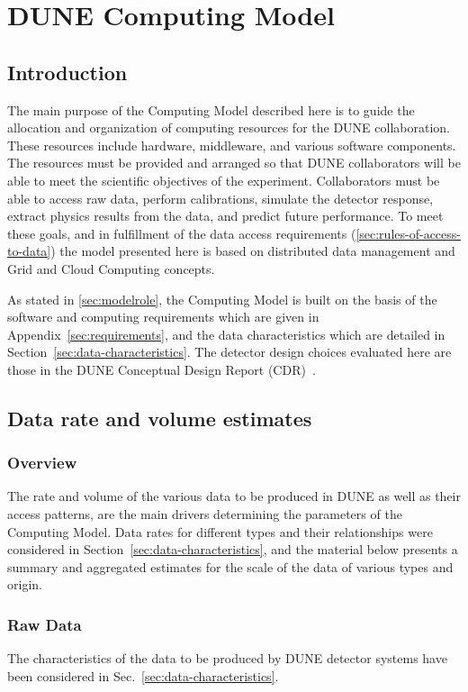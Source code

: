 \section{DUNE Computing Model}
\label{sec:computing_model}

\subsection{Introduction}

The main purpose of the Computing Model described here is to guide the allocation and organization of computing
resources for the DUNE collaboration.  These resources include hardware, middleware, and various software components.
The resources must be provided and arranged so that DUNE collaborators will be able to meet the scientific objectives
of the experiment.  Collaborators must be able to access raw data, perform calibrations, simulate the detector
response, extract physics results from the data, and predict future performance.
To meet these goals, and in fulfillment of the data access requirements (\ref{sec:rules-of-access-to-data})
the model presented here is based on distributed data management and Grid and Cloud Computing concepts.

As stated in \ref{sec:modelrole}, the Computing Model is built on the basis of the software and computing requirements
which are given in Appendix~\ref{sec:requirements}, and the data characteristics which are detailed in Section~\ref{sec:data-characteristics}.
The detector design choices evaluated here are those in the DUNE Conceptual Design Report (CDR)~\cite{cdr_vol2,cdr_vol4_docdb}.

\subsection{Data rate and volume estimates}
\label{sec:data-rate-and-volume-estimates}
\subsubsection{Overview}
The rate and volume of the various data to be produced in DUNE as well as their access patterns, are the main drivers determining the parameters
of the Computing Model. Data rates for different types and their relationships were considered in Section~\ref{sec:data-characteristics},
and the material below presents a summary and aggregated estimates for the scale of the data of various types
and origin.

\subsubsection{Raw Data}
The characteristics of the data to be produced by DUNE detector systems have been considered in
Sec.~\ref{sec:data-characteristics}.

